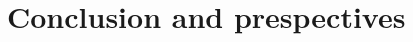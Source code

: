 \documentclass[11pt,a4paper]{report}
\begin{document}


\chapter{Conclusion and prespectives}


\end{document}
